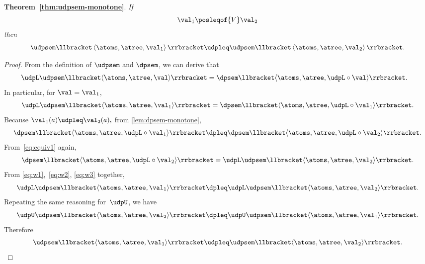 \textbf{Theorem~\ref{thm:udpsem-monotone}}. \emph{If
	\[
		\val_{1}\posleqof{V}\val_{2}
	\]
	then
	\[
		\udpsem\llbracket\left\langle \atoms,\atree,\val_{1}\right\rangle \rrbracket\udpleq\udpsem\llbracket\left\langle \atoms,\atree,\val_{2}\right\rangle \rrbracket.
	\]
}
\begin{proof}
	From the definition of $\udpsem$ and $\dpsem$, we can derive that
	\begin{align}
		\udpL\udpsem\llbracket\langle\atoms,\atree,\val\rangle\rrbracket & =\dpsem\llbracket\langle\atoms,\atree,\udpL\circ\val\rangle\rrbracket.
		\label{eq:equiv1}
	\end{align}
	In particular, for $\val=\val_{1}$,
	\begin{equation}
		\udpL\udpsem\llbracket\langle\atoms,\atree,\val_{1}\rangle\rrbracket=\dpsem\llbracket\langle\atoms,\atree,\udpL\circ\val_{1}\rangle\rrbracket.
		\label{eq:w1}
	\end{equation}
	Because $\val_{1}(a)\udpleq\val_{2}(a),$ from \cref{lem:dpsem-monotone},
	\begin{equation}
		\dpsem\llbracket\langle\atoms,\atree,\udpL\circ\val_{1}\rangle\rrbracket\dpleq\dpsem\llbracket\langle\atoms,\atree,\udpL\circ\val_{2}\rangle\rrbracket.
		\label{eq:w2}
	\end{equation}
	From~\cref{eq:equiv1} again,
	\begin{equation}
		\dpsem\llbracket\langle\atoms,\atree,\udpL\circ\val_{2}\rangle\rrbracket=\udpL\udpsem\llbracket\langle\atoms,\atree,\val_{2}\rangle\rrbracket.
		\label{eq:w3}
	\end{equation}
	From \cref{eq:w1},~\cref{eq:w2}, \cref{eq:w3} together,
	\[
		\udpL\udpsem\llbracket\langle\atoms,\atree,\val_{1}\rangle\rrbracket\dpleq\udpL\udpsem\llbracket\langle\atoms,\atree,\val_{2}\rangle\rrbracket.
	\]
	Repeating the same reasoning for~$\udpU$, we have
	\[
		\udpU\udpsem\llbracket\langle\atoms,\atree,\val_{2}\rangle\rrbracket\dpleq\udpU\udpsem\llbracket\langle\atoms,\atree,\val_{1}\rangle\rrbracket.
	\]
	Therefore
	\[
		\udpsem\llbracket\langle\atoms,\atree,\val_{1}\rangle\rrbracket\udpleq\udpsem\llbracket\langle\atoms,\atree,\val_{2}\rangle\rrbracket.
	\]
\end{proof}

\vfill\pagebreak

